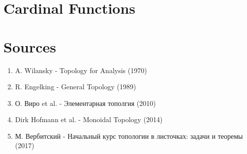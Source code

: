 \documentclass[12pt]{scrartcl}
\renewcommand{\.}{\; . \;}
\begin{document}
\section{Cardinal Functions}
\section*{Sources}
\begin{enumerate}
\item A. Wilansky - Topology for Analysis (1970) 
\item R. Engelking - General Topology (1989) 
\item О. Виро et al. - Элементарная тополгия (2010)
\item Dirk Hofmann et al. - Monoidal Topology (2014)
\item М. Вербитский - Начальный курс топологии в листочках: задачи и теоремы (2017)
\end{enumerate}
\end{document}
